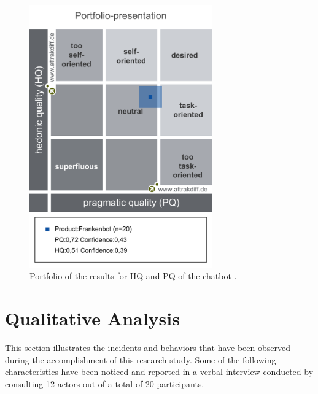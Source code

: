 \begin{figure}[!h]
    \centering
    \includegraphics[width=0.7\textwidth]{img/Portfolio_of_results.png}
    \caption{Portfolio of the results for HQ and PQ of the chatbot \cite{attrakdiff}.}
    \label{fig:portRes}
\end{figure}

\section{Qualitative Analysis}
This section illustrates the incidents and behaviors that have been observed during the accomplishment of this research study. Some of the following characteristics have been noticed and reported in a verbal interview conducted by consulting 12 actors out of a total of 20 participants.

